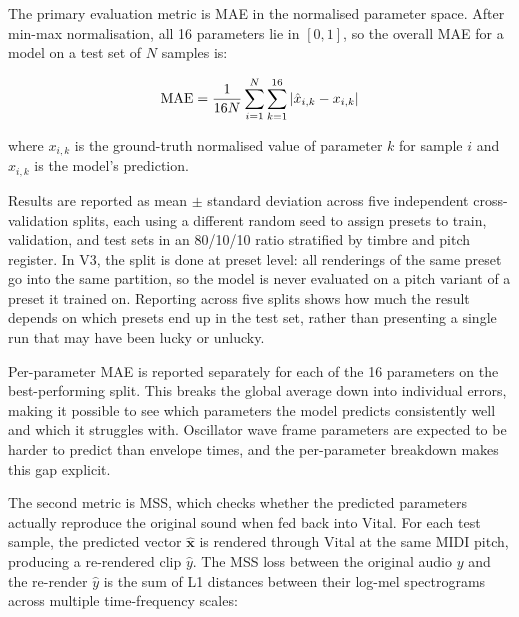 The primary evaluation metric is MAE in the normalised parameter space. After min-max normalisation, all 16 parameters lie in $[0, 1]$, so the overall MAE for a model on a test set of $N$ samples is:

\begin{equation}
\text{MAE} = \frac{1}{16N} \sum_{i=1}^{N} \sum_{k=1}^{16} \left|\hat{x}_{i,k} - x_{i,k}\right|
\label{eq:mae}\eqname{Mean Absolute Error metric}
\end{equation}

\noindent where $x_{i,k}$ is the ground-truth normalised value of parameter $k$ for sample $i$ and $\hat{x}_{i,k}$ is the model's prediction.

\par \vspace{0.3cm}
\noindent Results are reported as mean $\pm$ standard deviation across five independent cross-validation splits, each using a different random seed to assign presets to train, validation, and test sets in an 80/10/10 ratio stratified by timbre and pitch register. In V3, the split is done at preset level: all renderings of the same preset go into the same partition, so the model is never evaluated on a pitch variant of a preset it trained on. Reporting across five splits shows how much the result depends on which presets end up in the test set, rather than presenting a single run that may have been lucky or unlucky.

\par \vspace{0.3cm}
\noindent Per-parameter MAE is reported separately for each of the 16 parameters on the best-performing split. This breaks the global average down into individual errors, making it possible to see which parameters the model predicts consistently well and which it struggles with. Oscillator wave frame parameters are expected to be harder to predict than envelope times, and the per-parameter breakdown makes this gap explicit.

\par \vspace{0.3cm}
\noindent The second metric is MSS, which checks whether the predicted parameters actually reproduce the original sound when fed back into Vital. For each test sample, the predicted vector $\hat{\mathbf{x}}$ is rendered through Vital at the same MIDI pitch, producing a re-rendered clip $\hat{y}$. The MSS loss between the original audio $y$ and the re-render $\hat{y}$ is the sum of L1 distances between their log-mel spectrograms across multiple time-frequency scales:


